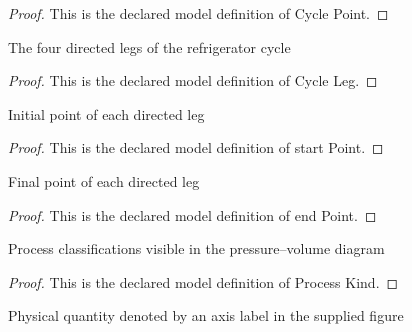 \begin{proof}
  This is the declared model definition of Cycle Point.
\end{proof}
\begin{definition}
  \label{def:physics:phyx-mini-0423:phyxminiproblems-problemphyxmini0423-cycleleg}
  The four directed legs of the refrigerator cycle
\end{definition}
\begin{proof}
  This is the declared model definition of Cycle Leg.
\end{proof}
\begin{definition}
  \label{def:physics:phyx-mini-0423:phyxminiproblems-problemphyxmini0423-startpoint}
  Initial point of each directed leg
\end{definition}
\begin{proof}
  This is the declared model definition of start Point.
\end{proof}
\begin{definition}
  \label{def:physics:phyx-mini-0423:phyxminiproblems-problemphyxmini0423-endpoint}
  Final point of each directed leg
\end{definition}
\begin{proof}
  This is the declared model definition of end Point.
\end{proof}
\begin{definition}
  \label{def:physics:phyx-mini-0423:phyxminiproblems-problemphyxmini0423-processkind}
  Process classifications visible in the pressure--volume diagram
\end{definition}
\begin{proof}
  This is the declared model definition of Process Kind.
\end{proof}
\begin{definition}
  \label{def:physics:phyx-mini-0423:phyxminiproblems-problemphyxmini0423-axislabel}
  Physical quantity denoted by an axis label in the supplied figure
\end{definition}
